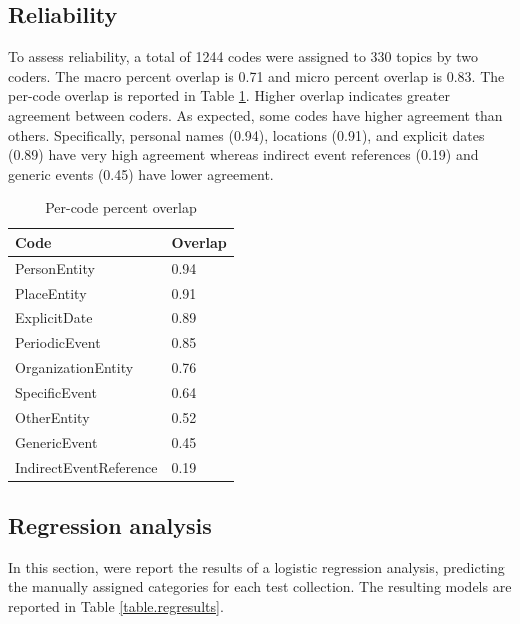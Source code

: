 \documentclass{sig-alternate}
\begin{document}
\subsection{Reliability}

To assess reliability, a total of 1244 codes were assigned to 330 topics by two coders. The macro percent overlap is 0.71 and  micro percent overlap is 0.83. The per-code overlap is reported in Table \ref{table.overlap}. Higher overlap indicates greater agreement between coders. As expected, some codes have higher agreement than others. Specifically, personal names (0.94), locations (0.91), and explicit dates (0.89) have very high agreement whereas indirect event references (0.19) and generic events (0.45) have lower agreement.

\begin{table}
\small
\begin{tabular}{| l | l |} \hline
\bf{Code} & \bf{Overlap}  \\ \hline
PersonEntity & 0.94  \\ \hline
PlaceEntity  & 0.91  \\ \hline
ExplicitDate & 0.89   \\ \hline
PeriodicEvent & 0.85   \\ \hline
OrganizationEntity & 0.76  \\ \hline
SpecificEvent & 0.64  \\ \hline
OtherEntity & 0.52  \\ \hline
GenericEvent & 0.45  \\ \hline
IndirectEventReference & 0.19  \\ \hline
\end{tabular}
\caption{Per-code percent overlap }
\label{table.overlap}
\end{table}

\subsection{Regression analysis}

In this section, were report the results of a logistic regression analysis, predicting the manually assigned categories for each test collection. The resulting models are reported in Table \ref{table.regresults}. 
\end{document}
